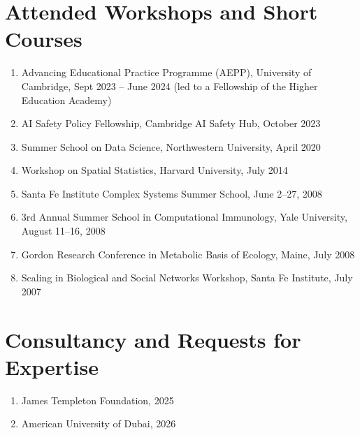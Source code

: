 \documentclass[11pt,a4paper]{article}
\begin{document}
\section*{Attended Workshops and Short Courses}
\begin{enumerate}
  \item Advancing Educational Practice Programme (AEPP), University of Cambridge, Sept 2023 -- June 2024 (led to a Fellowship of the Higher Education Academy)
  \item AI Safety Policy Fellowship, Cambridge AI Safety Hub, October 2023
  \item Summer School on Data Science, Northwestern University, April 2020
  \item Workshop on Spatial Statistics, Harvard University, July 2014
  \item Santa Fe Institute Complex Systems Summer School, June 2--27, 2008
  \item 3rd Annual Summer School in Computational Immunology, Yale University, August 11--16, 2008
  \item Gordon Research Conference in Metabolic Basis of Ecology, Maine, July 2008
  \item Scaling in Biological and Social Networks Workshop, Santa Fe Institute, July 2007
\end{enumerate}

\section*{Consultancy and Requests for Expertise}
\begin{enumerate}
  \item James Templeton Foundation, 2025
  \item American University of Dubai, 2026
\end{enumerate}
\end{document}
